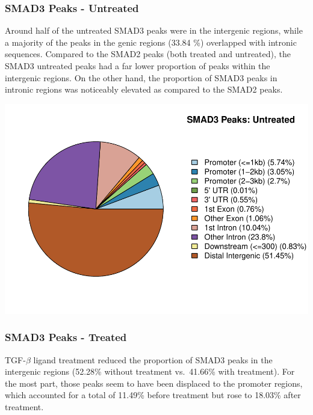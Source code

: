 \documentclass[]{article}
\begin{document}
\hypertarget{smad3-peaks---untreated}{%
\subsubsection{SMAD3 Peaks - Untreated}\label{smad3-peaks---untreated}}

Around half of the untreated SMAD3 peaks were in the intergenic regions,
while a majority of the peaks in the genic regions (33.84 \%) overlapped
with intronic sequences. Compared to the SMAD2 peaks (both treated and
untreated), the SMAD3 untreated peaks had a far lower proportion of
peaks within the intergenic regions. On the other hand, the proportion
of SMAD3 peaks in intronic regions was noticeably elevated as compared
to the SMAD2 peaks.

\includegraphics{Bioinfo_Analysis_files/figure-latex/unnamed-chunk-7-1.pdf}

\hypertarget{smad3-peaks---treated}{%
\subsubsection{SMAD3 Peaks - Treated}\label{smad3-peaks---treated}}

TGF-\(\beta\) ligand treatment reduced the proportion of SMAD3 peaks in
the intergenic regions (52.28\% without treatment vs.~41.66\% with
treatment). For the most part, those peaks seem to have been displaced
to the promoter regions, which accounted for a total of 11.49\% before
treatment but rose to 18.03\% after treatment.
\end{document}
